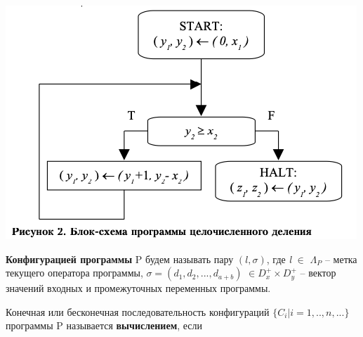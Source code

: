 \includegraphics[scale=0.5]{pics/block_scheme.png}

\textbf{Конфигурацией программы} P будем называть пару $( \textit{l}, \sigma )$, где \textit{l} $\in$ $\Lambda_P$ -- метка текущего оператора программы, $\sigma = (d_1,d_2,...,d_{a+b} )$ $\in D_x^+ \times D_y^+$ -- вектор значений входных и промежуточных переменных программы.


Конечная или бесконечная последовательность конфигураций $\{ C_i | i=1,..,n,...\}$ программы P называется \textbf{вычислением}, если

